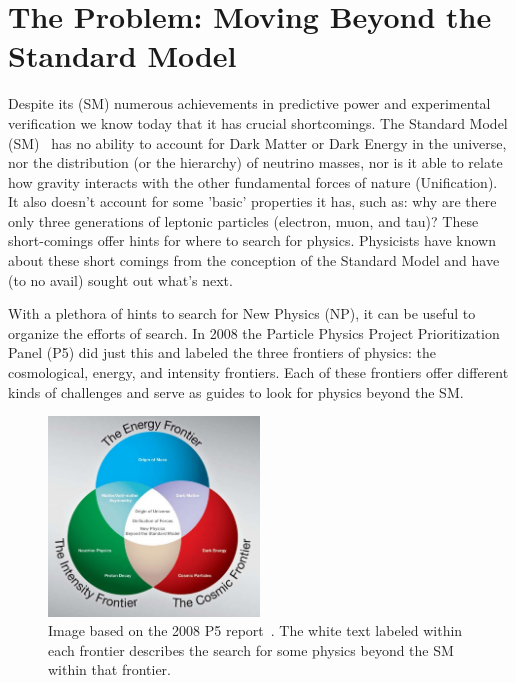 \section{The Problem: Moving Beyond the Standard Model}

Despite its (SM) numerous achievements in predictive power and experimental verification we know today that it has crucial shortcomings.
The Standard Model (SM)~\citep{GLASHOW1961579, salam1964electromagnetic, weinberg1967model} has no ability to account for Dark Matter or Dark Energy in the universe, nor the distribution (or the hierarchy) of neutrino masses, nor is it able to relate how gravity interacts with the other fundamental forces of nature (Unification).
It also doesn't account for some 'basic' properties it has, such as: why are there only three generations of leptonic particles (electron, muon, and tau)?
These short-comings offer hints for where to search for physics.
Physicists have known about these short comings from the conception of the Standard Model and have (to no avail) sought out what's next.

With a plethora of hints to search for New Physics (NP), it can be useful to organize the efforts of search.
In 2008 the Particle Physics Project Prioritization Panel (P5) did just this and labeled the three frontiers of physics: the cosmological, energy, and intensity frontiers.
Each of these frontiers offer different kinds of challenges and serve as guides to look for physics beyond the SM.

\begin{figure}[]
\centering
\includegraphics[width=0.5\textwidth]{images/frontiers_physics.jpg}
\caption{Image based on the 2008 P5 report~\citep{intensityfrontier2012_Hewett}. The white text labeled within each frontier describes the search for some physics beyond the SM within that frontier.}
\end{figure}


